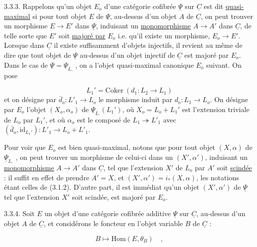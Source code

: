 
3.3.3. Rappelons qu'un objet $E_o$ d'une catégorie cofibrée $\underline{\Psi}$ sur $\underline{C}$ est dit \underline{quasi-maximal} si pour tout objet $E$ de $\underline{\Psi}$, au-dessus d'un objet $A$ de $\underline{C}$, on peut trouver un morphisme $E \longrightarrow E'$ dans $\underline{\Psi}$, induisant un \underline{monomorphisme} $A \longrightarrow A'$ dans $\underline{C}$, de telle sorte que $E'$ soit \underline{majoré par} $E_o$ i.e. qu'il existe un morphisme, $E_o \longrightarrow E'$. Lorsque dans $\underline{C}$ il existe suffisamment d'objets injectifs, il revient au même de dire que tout objet de $\underline{\Psi}$ au-dessus d'un objet injectif de $\underline{C}$ est majoré par $E_o$. Dans le cas de $\underline{\Psi} = \underline{\Psi}_{L.}$ , on a l'objet quasi-maximal canonique $E_o$ suivant. On pose

\begin{equation*}
L_1' = \mathrm{Coker}\ (d_1 : L_2 \longrightarrow L_1)
\end{equation*}
et on désigne par $\bar d_o:L'_1\longrightarrow L_o$ le morphisme induit par $d_o:L_1\longrightarrow L_o$. On désigne par $E_o$ l'objet $(X_o,\alpha_o)$ de $\underline{\Psi}_{L.}(L_1')$, où $X_o = L_o + L_1'$ est l'extension triviale de $L_o$ par $L_1'$, et où $\alpha_o$ est le composé de $L_1\twoheadrightarrow L'_1$ avec $(\bar d_o,\mathrm{id}_{L_1'}):L'_1\longrightarrow L_o+L'_1$.

Pour voir que $E_o$ est bien quasi-maximal, notons que pour tout objet $(X,\alpha)$ de $\underline{\Psi}_{L.}$ , on peut trouver un morphisme de celui-ci dans un $(X',\alpha')$, induisant un \underline{monomorphisme} $A \longrightarrow A'$ dans $\underline{C}$, tel que l'extension $X'$ de $L_o$ par $A'$ soit \underline{scindée} : il suffit en effet de prendre $A'=X$, et $(X',\alpha') = i_*(X,\alpha)$, les notations étant celles de (3.1.2). D'autre part, il est immédiat qu'un objet $(X',\alpha')$ de $\underline{\Psi}$ tel que l'extension $X'$ soit scindée, est majoré par $E_o$.

3.3.4. Soit $E$ un objet d'une catégorie cofibrée additive $\underline{\Psi}$ sur $\underline{C}$, au-dessus d'un objet $A$ de $\underline{C}$, et considérons le foncteur en l'objet variable $B$ de $\underline{C}$ :

\begin{equation}\tag{3.3.4.1}
B \longmapsto \mathrm{Hom}(E,\theta_B) \quad , 
\end{equation}

